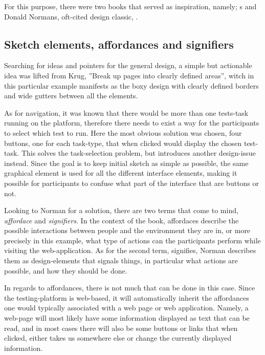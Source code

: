 {	For this purpose, there were two books that served as inspiration, namely;
	\citeauthor{citeDonMakeMeThink}s
	\cite{citeDonMakeMeThink} and Donald Normans,
	oft-cited design classic,
	\cite{citeTheDesignOfEverydayThings}.

	\subsection{Sketch elements, affordances and signifiers}

	Searching for ideas and pointers for the general design, a simple but
	actionable idea was lifted from Krug, ''Break up pages into clearly defined
	areas'', witch in this particular example manifests as the boxy design with
	clearly defined borders and wide gutters between all the elements.

  As for navigation, it was known that there would be more than one tests-task
  running on the platform, therefore there needs to exist a way for the
  participants to select which test to run. Here the most obvious solution was
  chosen, four buttons, one for each task-type, that when clicked would display
  the chosen test-task. This solves the task-selection problem, but introduces
  another design-issue instead. Since the goal is to keep initial sketch as
  simple as possible, the same graphical element is used for all the different
  interface elements, making it possible for participants to confuse what part
  of the interface that are buttons or not.

	Looking to Norman for a solution, there are two terms that come to mind,
	\textit{affordace} and \textit{signifiers}. In the context of the book,
	affordaces describe the possible interactions between people and the
	environment they are in, or more precisely in this example, what type of
	actions can the participants perform while visiting the web-application. As
	for the second term, signifies, Norman describes them as design-elements that
	signals things, in particular what actions are possible, and how they should
	be done.

  In regards to affordances, there is not much that can be done in this
  case. Since the testing-platform is web-based, it will automatically inherit
  the affordances one would typically associated with a web page or web
  application. Namely, a web-page will most likely have some information
  displayed as text that can be read, and in most cases there will also be some
  buttons or links that when clicked, either takes us somewhere else or change
  the currently displayed information.

}
